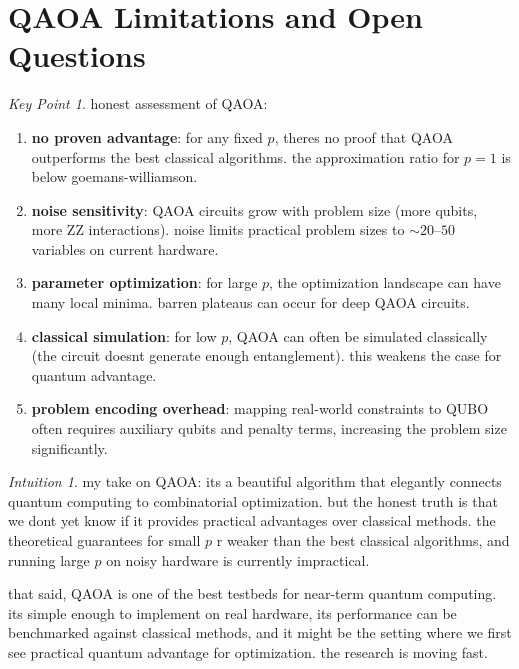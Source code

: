 \documentclass[11pt,a4paper]{article}
\theoremstyle{definition}
\theoremstyle{remark}
\newtheorem*{intuition}{Intuition}
\newtheorem*{keypoint}{Key Point}
\begin{document}
\section{QAOA Limitations and Open Questions}

\begin{keypoint}
honest assessment of QAOA:
\begin{enumerate}
    \item \textbf{no proven advantage}: for any fixed $p$, theres no proof that QAOA outperforms the best classical algorithms. the approximation ratio for $p = 1$ is below goemans-williamson.
    \item \textbf{noise sensitivity}: QAOA circuits grow with problem size (more qubits, more ZZ interactions). noise limits practical problem sizes to $\sim 20$--$50$ variables on current hardware.
    \item \textbf{parameter optimization}: for large $p$, the optimization landscape can have many local minima. barren plateaus can occur for deep QAOA circuits.
    \item \textbf{classical simulation}: for low $p$, QAOA can often be simulated classically (the circuit doesnt generate enough entanglement). this weakens the case for quantum advantage.
    \item \textbf{problem encoding overhead}: mapping real-world constraints to QUBO often requires auxiliary qubits and penalty terms, increasing the problem size significantly.
\end{enumerate}
\end{keypoint}

\begin{intuition}
my take on QAOA: its a beautiful algorithm that elegantly connects quantum computing to combinatorial optimization. but the honest truth is that we dont yet know if it provides practical advantages over classical methods. the theoretical guarantees for small $p$ r weaker than the best classical algorithms, and running large $p$ on noisy hardware is currently impractical.

that said, QAOA is one of the best testbeds for near-term quantum computing. its simple enough to implement on real hardware, its performance can be benchmarked against classical methods, and it might be the setting where we first see practical quantum advantage for optimization. the research is moving fast.
\end{intuition}
\end{document}
